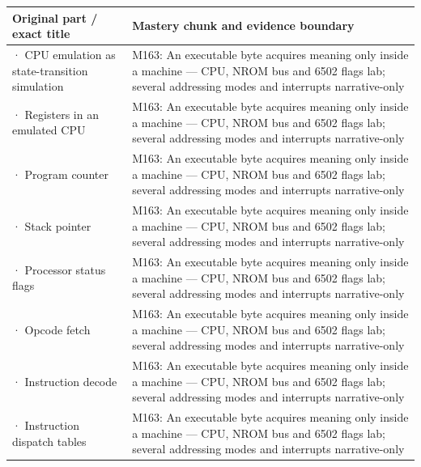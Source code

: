 {\def\LTcaptype{none} %
\begin{longtable}[]{@{}
  >{\raggedright\arraybackslash}p{}
  >{\raggedright\arraybackslash}p{}@{}}
\toprule\noalign{}
\begin{minipage}[b]{\linewidth}\raggedright
Original part / exact title
\end{minipage} & \begin{minipage}[b]{\linewidth}\raggedright
Mastery chunk and evidence boundary
\end{minipage} \\
\midrule\noalign{}
\endhead
\bottomrule\noalign{}
\endlastfoot
2701 · CPU emulation as state-transition simulation & M163: An executable byte acquires meaning only inside a machine --- CPU, NROM bus and 6502 flags lab; several addressing modes and interrupts narrative-only \\
2702 · Registers in an emulated CPU & M163: An executable byte acquires meaning only inside a machine --- CPU, NROM bus and 6502 flags lab; several addressing modes and interrupts narrative-only \\
2703 · Program counter & M163: An executable byte acquires meaning only inside a machine --- CPU, NROM bus and 6502 flags lab; several addressing modes and interrupts narrative-only \\
2704 · Stack pointer & M163: An executable byte acquires meaning only inside a machine --- CPU, NROM bus and 6502 flags lab; several addressing modes and interrupts narrative-only \\
2705 · Processor status flags & M163: An executable byte acquires meaning only inside a machine --- CPU, NROM bus and 6502 flags lab; several addressing modes and interrupts narrative-only \\
2706 · Opcode fetch & M163: An executable byte acquires meaning only inside a machine --- CPU, NROM bus and 6502 flags lab; several addressing modes and interrupts narrative-only \\
2707 · Instruction decode & M163: An executable byte acquires meaning only inside a machine --- CPU, NROM bus and 6502 flags lab; several addressing modes and interrupts narrative-only \\
2708 · Instruction dispatch tables & M163: An executable byte acquires meaning only inside a machine --- CPU, NROM bus and 6502 flags lab; several addressing modes and interrupts narrative-only \\

\end{longtable}}
